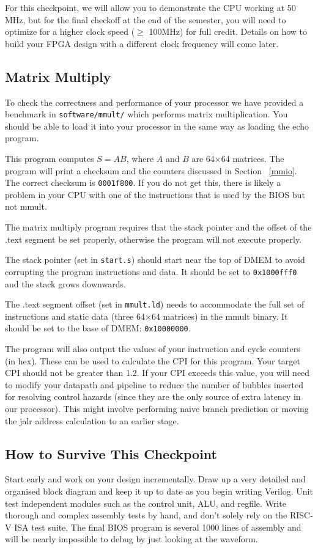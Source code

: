 \documentclass[11pt]{article}
\begin{document}
For this checkpoint, we will allow you to demonstrate the CPU working at 50 MHz, but for the final checkoff at the end of the semester, you will need to optimize for a higher clock speed ($\geq$ 100MHz) for full credit.
Details on how to build your FPGA design with a different clock frequency will come later.

\subsection{Matrix Multiply}
\label{mmult}
To check the correctness and performance of your processor we have provided a benchmark in \verb|software/mmult/| which performs matrix multiplication.
You should be able to load it into your processor in the same way as loading the echo program.

This program computes $S=AB$, where $A$ and $B$ are 64$\times$64 matrices.
The program will print a checksum and the counters discussed in Section ~\ref{mmio}.
The correct checksum is \verb|0001f800|.
If you do not get this, there is likely a problem in your CPU with one of the instructions that is used by the BIOS but not mmult.

The matrix multiply program requires that the stack pointer and the offset of the .text segment be set properly, otherwise the program will not execute properly.

The stack pointer (set in \verb|start.s|) should start near the top of DMEM to avoid corrupting the program instructions and data.
It should be set to \verb|0x1000fff0| and the stack grows downwards.

The .text segment offset (set in \verb|mmult.ld|) needs to accommodate the full set of instructions and static data (three 64$\times$64 matrices) in the mmult binary.
It should be set to the base of DMEM: \verb|0x10000000|.

The program will also output the values of your instruction and cycle counters (in hex).
These can be used to calculate the CPI for this program.
Your target CPI should not be greater than 1.2.
If your CPI exceeds this value, you will need to modify your datapath and pipeline to reduce the number of bubbles inserted for resolving control hazards (since they are the only source of extra latency in our processor).
This might involve performing naive branch prediction or moving the jalr address calculation to an earlier stage.

\subsection{How to Survive This Checkpoint}
Start early and work on your design incrementally.
Draw up a very detailed and organised block diagram and keep it up to date as you begin writing Verilog.
Unit test independent modules such as the control unit, ALU, and regfile.
Write thorough and complex assembly tests by hand, and don't solely rely on the RISC-V ISA test suite.
The final BIOS program is several 1000 lines of assembly and will be nearly impossible to debug by just looking at the waveform.
\end{document}
